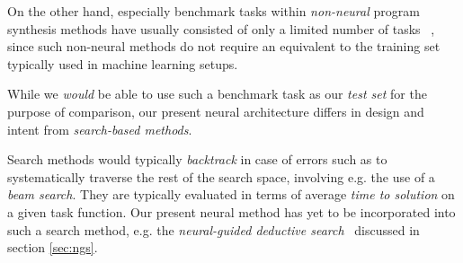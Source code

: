 \documentclass{article}
\begin{document}
On the other hand, especially benchmark tasks within \emph{non-neural} program synthesis methods have usually consisted of only a limited number of tasks%
~\citep{myth,lambda2,typedmil,houdini,tamandu,dilp,terpret},
since such non-neural methods do not require an equivalent to the training set typically used in machine learning setups.





While we \emph{would} be able to use such a benchmark task as our \emph{test set} for the purpose of comparison,
our present neural architecture differs in design and intent from \emph{search-based methods}.

Search methods would typically \emph{backtrack} in case of errors such as to systematically traverse the rest of the search space,
involving e.g. the use of a \emph{beam search}.
They are typically evaluated in terms of average \emph{time to solution} on a given task function.
Our present neural method has yet to be incorporated into such a search method,
e.g. the \emph{neural-guided deductive search}~\citep{deepcoder} discussed in section \ref{sec:ngs}.
\end{document}
